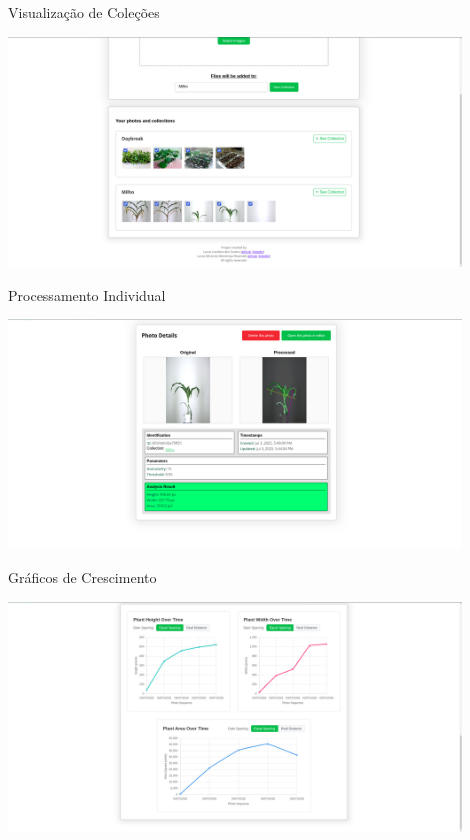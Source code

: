 \documentclass[landscape, 12pt]{beamer}
\begin{document}
\begin{frame}{Visualização de Coleções}
    \begin{center}
        \includegraphics[width=0.9\textwidth]{../figures/screens/colecoes.png}
    \end{center}
\end{frame}

\begin{frame}{Processamento Individual}
    \begin{center}
        \includegraphics[width=0.9\textwidth]{../figures/screens/processamento-individual.png}
    \end{center}
\end{frame}

\begin{frame}{Gráficos de Crescimento}
    \begin{center}
        \includegraphics[width=0.9\textwidth]{../figures/screens/grafico-crescimento.png}
    \end{center}
\end{frame}
\end{document}
